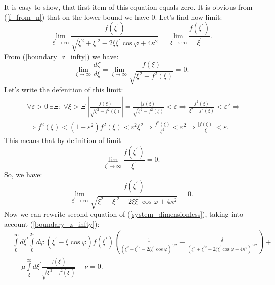 \documentclass[10pt]{article}
\begin{document}
It is easy to show, that first item of this equation equals zero.
It is obvious from (\ref{f_from_n}) that on the lower bound we have 0. %
Let's find now limit:
$$
  \lim_{\xi^{\prime} \rightarrow \infty} \frac{f(\xi^{\prime})}{\sqrt{ \xi^2 + \xi^{\prime 2} - 2 \xi \xi^{\prime} \cos \varphi + 4 \kappa^2 }} = \lim_{\xi^{\prime} \rightarrow \infty} \frac{f(\xi^{\prime})}{\xi^{\prime}}.
$$
From (\ref{boundary_z_infty}) we have:
\begin{equation}
  \lim_{\xi \rightarrow \infty} \frac{d \zeta}{d \xi} = \lim_{\xi \rightarrow \infty} \frac{f(\xi)}{\sqrt{\xi^2 - f^2 (\xi)}} = 0.
\end{equation}
Let's write the defenition of this limit:
$$
  \begin{aligned}
    &\forall \varepsilon>0\ \exists \varXi:\ \forall \xi > \varXi\ 
    \left| \frac{f(\xi)}{\sqrt{\xi^2-f^2(\xi)}} \right| = \frac{|f(\xi)|}{\sqrt{\xi^2-f^2(\xi)}} < \varepsilon \Rightarrow \frac{f^2(\xi)}{\xi^2 - f^2(\xi)} < \varepsilon^2 \Rightarrow \\
    &{} \Rightarrow f^2(\xi) < (1 + \varepsilon^2) f^2(\xi) < \varepsilon^2 \xi^2 \Rightarrow \frac{f^2(\xi)}{\xi^2}<\varepsilon^2 \Rightarrow \frac{|f(\xi)|}{\xi} < \varepsilon.
  \end{aligned}
$$
This means that by definition of limit
$$
  \lim_{\xi^{\prime} \rightarrow \infty} \frac{f(\xi^{\prime})}{\xi^{\prime}} = 0.
$$
So, we have:
\begin{equation}
  \lim_{\xi^{\prime} \rightarrow \infty} \frac{f(\xi^{\prime})}{\sqrt{ \xi^2 + \xi^{\prime 2} - 2 \xi \xi^{\prime} \cos \varphi + 4 \kappa^2 }} = 0.
\end{equation}
Now we can rewrite second equation of (\ref{system_dimensionless}), taking into account (\ref{boundary_z_infty}):
\begin{equation}
  \begin{aligned}
    &\int\limits_0^\infty d \xi^{\prime} \int\limits_0^{2 \pi} d \varphi \, (\xi^{\prime} - \xi \cos \varphi) f(\xi^{\prime}) \left( \frac{1}{ (\xi^2 + \xi^{\prime 2} - 2 \xi \xi^{\prime} \cos \varphi)^{3/2}} - \frac{\delta}{ ( \xi^2 + \xi^{\prime 2} - 2 \xi \xi^{\prime} \cos \varphi + 4 \kappa^2 )^{3/2} } \right) + \\
    &{} - \mu \int\limits_\xi^{\infty} d\xi^{\prime} \frac{f(\xi^{\prime})}{\sqrt{\xi^{\prime 2} - f^2 (\xi^{\prime})}} + \nu = 0.
  \end{aligned}
  \label{eqn_f}
\end{equation}
\end{document}
